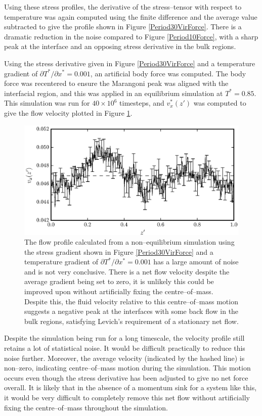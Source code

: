 Using these stress profiles, the derivative of the stress--tensor with respect to temperature was again computed using the finite difference and the average value subtracted to give the profile shown in Figure \ref{Period30VirForce}.
There is a dramatic reduction in the noise compared to Figure \ref{Period10Force}, with a sharp peak at the interface and an opposing stress derivative in the bulk regions.
\FloatBarrier

Using the stress derivative given in Figure \ref{Period30VirForce} and a temperature gradient of $\partial T^{*} / \partial x^{*} = 0.001$, an artificial body force was computed.
The body force was recentered to ensure the Marangoni peak was aligned with the interfacial region, and this was applied in an equilibrium simulation at $T^{*} = 0.85$.
This simulation was run for $40 \times 10^{6}$ timesteps, and $v^{*}_x(z')$ was computed to give the flow velocity plotted in Figure \ref{Period30VirFlow}.

\begin{figure}[h]
\centering
\includegraphics[scale=0.8]{Period30VirFlow}
\caption{The flow profile calculated from a non--equilibrium simulation using the stress gradient shown in Figure \ref{Period30VirForce} and a temperature gradient of $\partial T^{*} / \partial x^{*} = 0.001$ has a large amount of noise and is not very conclusive.
There is a net flow velocity despite the average gradient being set to zero, it is unlikely this could be improved upon without artificially fixing the centre--of--mass.
Despite this, the fluid velocity relative to this centre--of--mass motion suggests a negative peak at the interfaces with some back flow in the bulk regions, satisfying Levich's requirement of a stationary net flow.\cite{Levich}
 }
\label{Period30VirFlow}
\end{figure}

Despite the simulation being run for a long timescale, the velocity profile still retains a lot of statistical noise.
It would be difficult practically to reduce this noise further.
Moreover, the average velocity (indicated by the hashed line) is non--zero, indicating centre--of--mass motion during the simulation.
This motion occurs even though the stress derivative has been adjusted to give no net force overall.
It is likely that in the absence of a momentum sink for a system like this, it would be very difficult to completely remove this net flow without artificially fixing the centre--of--mass throughout the simulation.

